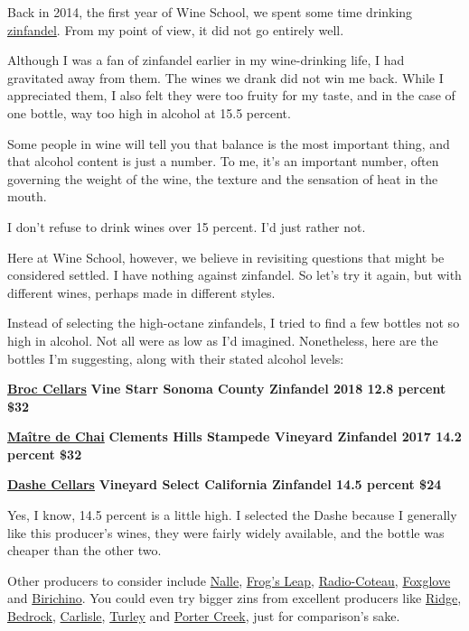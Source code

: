 Back in 2014, the first year of Wine School, we spent some time drinking
\href{https://www.nytimes.com/2014/07/09/dining/your-next-lesson-zinfandel.html}{zinfandel}.
From my point of view, it did not go entirely well.

Although I was a fan of zinfandel earlier in my wine-drinking life, I
had gravitated away from them. The wines we drank did not win me back.
While I appreciated them, I also felt they were too fruity for my taste,
and in the case of one bottle, way too high in alcohol at 15.5 percent.

Some people in wine will tell you that balance is the most important
thing, and that alcohol content is just a number. To me, it's an
important number, often governing the weight of the wine, the texture
and the sensation of heat in the mouth.

I don't refuse to drink wines over 15 percent. I'd just rather not.

Here at Wine School, however, we believe in revisiting questions that
might be considered settled. I have nothing against zinfandel. So let's
try it again, but with different wines, perhaps made in different
styles.

Instead of selecting the high-octane zinfandels, I tried to find a few
bottles not so high in alcohol. Not all were as low as I'd imagined.
Nonetheless, here are the bottles I'm suggesting, along with their
stated alcohol levels:

\href{https://broccellars.com/}{\textbf{Broc Cellars}} \textbf{Vine
Starr Sonoma County Zinfandel 2018 12.8 percent \$32}

\href{https://www.mdc.wine/}{\textbf{Maître de Chai}} \textbf{Clements
Hills Stampede Vineyard Zinfandel 2017 14.2 percent \$32}

\href{https://www.dashecellars.com/}{\textbf{Dashe Cellars}}
\textbf{Vineyard Select California Zinfandel 14.5 percent \$24}

Yes, I know, 14.5 percent is a little high. I selected the Dashe because
I generally like this producer's wines, they were fairly widely
available, and the bottle was cheaper than the other two.

Other producers to consider include
\href{https://www.nallewinery.com/}{Nalle},
\href{https://www.frogsleap.com/}{Frog's Leap},
\href{https://radiocoteau.com/}{Radio-Coteau},
\href{http://varnerwine.com/}{Foxglove} and
\href{http://www.birichino.com/}{Birichino}. You could even try bigger
zins from excellent producers like
\href{https://www.ridgewine.com/}{Ridge},
\href{https://www.bedrockwineco.com/}{Bedrock},
\href{https://www.carlislewinery.com/}{Carlisle},
\href{http://www.turleywinecellars.com/}{Turley} and
\href{https://portercreekvineyards.com/}{Porter Creek}, just for
comparison's sake.

